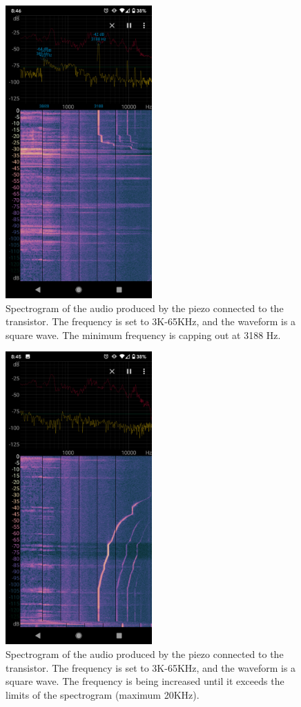 \documentclass[12pt]{article}
\begin{document}
\begin{figure}[H]	
    \centering
    \includegraphics[width=0.5\textwidth]{spec3.png} 
    \caption{Spectrogram of the audio produced by the piezo connected to the transistor. The frequency is 
    set to 3K-65KHz, and the waveform is a square wave. The minimum frequency is capping out at 3188 Hz.}
    \label{fig:specb}
\end{figure}

\begin{figure}[H]	
    \centering
    \includegraphics[width=0.5\textwidth]{spec4.png} 
    \caption{Spectrogram of the audio produced by the piezo connected to the transistor. The frequency is 
    set to 3K-65KHz, and the waveform is a square wave. The frequency is being increased until it exceeds 
    the limits of the spectrogram (maximum 20KHz).}
    \label{fig:specc}
\end{figure}
\end{document}
